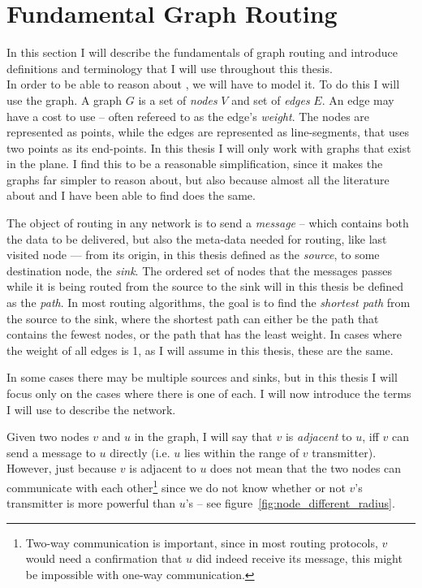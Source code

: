 

\section{Fundamental Graph Routing}
\label{fundamental}
In this section I will describe the fundamentals of graph routing and introduce definitions and terminology that I will use throughout this thesis.\\

In order to be able to reason about \manet, we will have to model it. To do this I will use the graph. A graph $G$ is a set of \emph{nodes} $V$ and set of \emph{edges} $E$. An edge may have a cost to use -- often refereed to as the edge's \emph{weight}. The nodes are represented as points, while the edges are represented as line-segments, that uses two points as its end-points. In this thesis I will only work with graphs that exist in the plane. I find this to be a reasonable simplification, since it makes the graphs far simpler to reason about, but also because almost all the literature about \manet and \anet I have been able to find does the same. 

The object of routing in any network is to send a \emph{message} -- which contains both the data to be delivered, but also the meta-data needed for routing, like last visited node --- from its origin, in this thesis defined as the \emph{source}, to some destination node, the \emph{sink}. The ordered set of nodes that the messages passes while it is being routed from the source to the sink will in this thesis be defined as the \emph{path}. In most routing algorithms, the goal is to find the \emph{shortest path} from the source to the sink, where the shortest path can either be the path that contains the fewest nodes, or the path that has the least weight. In cases where the weight of all edges is 1, as I will assume in this thesis, these are the same. 

In some cases there may be multiple sources and sinks, but in this thesis I will focus only on the cases where there is one of each. I will now introduce the terms I will use to describe the network.


Given two nodes $v$ and $u$ in the graph, I will say that $v$ is \emph{adjacent} to $u$, iff $v$ can send a message to $u$ directly (i.e. $u$ lies within the range of $v$ transmitter). However, just because $v$ is adjacent to $u$ does not mean that the two nodes can communicate with each other\footnote{Two-way communication is important, since in most routing protocols, $v$ would need a confirmation that $u$ did indeed receive its message, this might be impossible with one-way communication.} since we do not know whether or not $v$'s transmitter is more powerful than $u$'s -- see figure~\ref{fig:node_different_radius}. 

